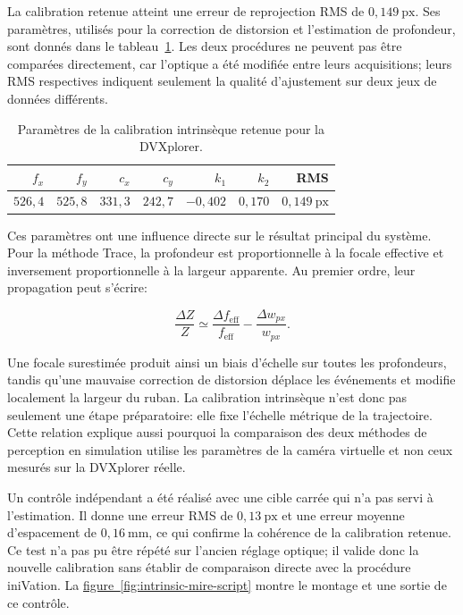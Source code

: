 \documentclass[a4paper,11pt]{report}
\newcommand{\figref}[1]{\hyperref[#1]{figure~\ref*{#1}}}
\begin{document}
La calibration retenue atteint une erreur de reprojection RMS de
\(0{,}149~\text{px}\). Ses paramètres, utilisés pour la correction de
distorsion et l'estimation de profondeur, sont donnés dans le
tableau~\ref{tab:intrinsic-sets}. Les deux procédures ne peuvent pas être
comparées directement, car l'optique a été modifiée entre leurs acquisitions;
leurs RMS respectives indiquent seulement la qualité d'ajustement sur deux jeux
de données différents.

\begin{table}[H]
  \centering
  \caption{Paramètres de la calibration intrinsèque retenue pour la DVXplorer.}
  \label{tab:intrinsic-sets}
  \begin{tabular}{rrrrrrr}
    \toprule
    \(f_x\) & \(f_y\) & \(c_x\) & \(c_y\) & \(k_1\) & \(k_2\) & RMS \\
    \midrule
    \(526{,}4\) & \(525{,}8\) & \(331{,}3\) & \(242{,}7\) & \(-0{,}402\) & \(0{,}170\) & \(0{,}149~\text{px}\) \\
    \bottomrule
  \end{tabular}
\end{table}

Ces paramètres ont une influence directe sur le résultat principal du système.
Pour la méthode Trace, la profondeur est proportionnelle à la focale effective
et inversement proportionnelle à la largeur apparente. Au premier ordre, leur
propagation peut s'écrire:

\begin{equation}
\frac{\Delta Z}{Z}
\simeq
\frac{\Delta f_{\text{eff}}}{f_{\text{eff}}}
-
\frac{\Delta w_{px}}{w_{px}}.
\label{eq:propagation-intrinseques-trace}
\end{equation}

Une focale surestimée produit ainsi un biais d'échelle sur toutes les
profondeurs, tandis qu'une mauvaise correction de distorsion déplace les
événements et modifie localement la largeur du ruban. La calibration intrinsèque
n'est donc pas seulement une étape préparatoire: elle fixe l'échelle métrique
de la trajectoire. Cette relation explique aussi pourquoi la comparaison des
deux méthodes de perception en simulation utilise les paramètres de la caméra
virtuelle et non ceux mesurés sur la DVXplorer réelle.

Un contrôle indépendant a été réalisé avec une cible carrée qui n'a pas servi à
l'estimation. Il donne une erreur RMS de \(0{,}13~\text{px}\) et une erreur
moyenne d'espacement de \(0{,}16~\text{mm}\), ce qui confirme la cohérence de
la calibration retenue. Ce test n'a pas pu être répété sur l'ancien réglage
optique; il valide donc la nouvelle calibration sans établir de comparaison
directe avec la procédure iniVation. La \figref{fig:intrinsic-mire-script}
montre le montage et une sortie de ce contrôle.
\end{document}
